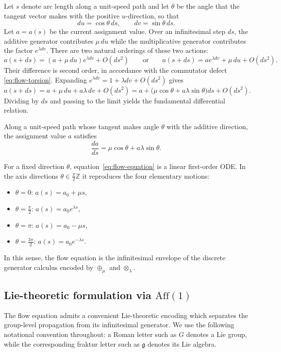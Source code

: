 Let $s$ denote arc length along a unit-speed path and let $\theta$ be the angle that the tangent vector makes with the positive $u$-direction, so that
\[
du = \cos\theta\,ds,
\qquad
dv = \sin\theta\,ds.
\]
Let $a=a(s)$ be the current assignment value. Over an infinitesimal step $ds$, the additive generator contributes $\mu\,du$ while the multiplicative generator contributes the factor $e^{\lambda dv}$. There are two natural orderings of these two actions:
\[
a(s+ds) = (a + \mu\,du)e^{\lambda dv} + O(ds^2)
\qquad\text{or}\qquad
a(s+ds) = a e^{\lambda dv} + \mu\,du + O(ds^2).
\]
Their difference is second order, in accordance with the commutator defect \eqref{eq:flow-torsion}. Expanding $e^{\lambda dv}=1+\lambda dv+O(ds^2)$ gives
\[
a(s+ds)
= a + \mu\,du + a\lambda\,dv + O(ds^2)
= a + \bigl(\mu\cos\theta + a\lambda\sin\theta\bigr)ds + O(ds^2).
\]
Dividing by $ds$ and passing to the limit yields the fundamental differential relation.

\begin{proposition}\label{prop:flow-equation}
Along a unit-speed path whose tangent makes angle $\theta$ with the additive direction, the assignment value $a$ satisfies
\begin{equation}\label{eq:flow-equation}
\frac{da}{ds} = \mu \cos \theta + a \lambda \sin \theta.
\end{equation}
\end{proposition}

For a fixed direction $\theta$, equation~\eqref{eq:flow-equation} is a linear first-order ODE. In the axis directions $\theta\in\frac{\pi}{2}\mathbb{Z}$ it reproduces the four elementary motions:
\begin{itemize}
    \item $\theta=0$: $a(s)=a_0+\mu s$,
    \item $\theta=\frac{\pi}{2}$: $a(s)=a_0 e^{\lambda s}$,
    \item $\theta=\pi$: $a(s)=a_0-\mu s$,
    \item $\theta=\frac{3\pi}{2}$: $a(s)=a_0 e^{-\lambda s}$.
\end{itemize}
In this sense, the flow equation is the infinitesimal envelope of the discrete generator calculus encoded by $\oplus_\mu$ and $\otimes_\lambda$.

\subsection{Lie-theoretic formulation via \texorpdfstring{$\mathrm{Aff}(1)$}{Aff(1)}}\label{subsec:flow-aff1}
The flow equation admits a convenient Lie-theoretic encoding which separates the group-level propagation from its infinitesimal generator. We use the following notational convention throughout: a Roman letter such as $G$ denotes a Lie group, while the corresponding fraktur letter such as $\mathfrak{g}$ denotes its Lie algebra.

